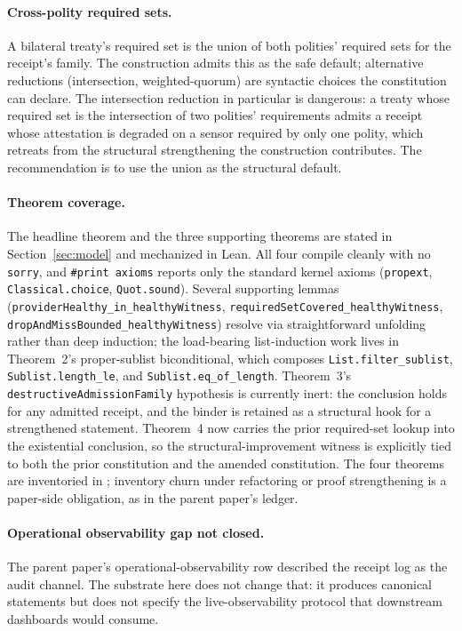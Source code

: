 \paragraph{Cross-polity required sets.}
A bilateral treaty's required set is the union of both polities' required sets for the receipt's family. The construction admits this as the safe default; alternative reductions (intersection, weighted-quorum) are syntactic choices the constitution can declare. The intersection reduction in particular is dangerous: a treaty whose required set is the intersection of two polities' requirements admits a receipt whose attestation is degraded on a sensor required by only one polity, which retreats from the structural strengthening the construction contributes. The recommendation is to use the union as the structural default.

\paragraph{Theorem coverage.}
The headline theorem and the three supporting theorems are stated in Section~\ref{sec:model} and mechanized in Lean. All four compile cleanly with no \texttt{sorry}, and \texttt{\#print axioms} reports only the standard kernel axioms (\texttt{propext}, \texttt{Classical.choice}, \texttt{Quot.sound}). Several supporting lemmas (\texttt{providerHealthy\_in\_healthyWitness}, \texttt{requiredSetCovered\_healthyWitness}, \texttt{dropAndMissBounded\_healthyWitness}) resolve via straightforward unfolding rather than deep induction; the load-bearing list-induction work lives in Theorem~2's proper-sublist biconditional, which composes \texttt{List.filter\_sublist}, \texttt{Sublist.length\_le}, and \texttt{Sublist.eq\_of\_length}. Theorem~3's \texttt{destructiveAdmissionFamily} hypothesis is currently inert: the conclusion holds for any admitted receipt, and the binder is retained as a structural hook for a strengthened statement. Theorem~4 now carries the prior required-set lookup into the existential conclusion, so the structural-improvement witness is explicitly tied to both the prior constitution and the amended constitution. The four theorems are inventoried in ; inventory churn under refactoring or proof strengthening is a paper-side obligation, as in the parent paper's ledger.

\paragraph{Operational observability gap not closed.}
The parent paper's operational-observability row described the receipt log as the audit channel. The substrate here does not change that: it produces canonical statements but does not specify the live-observability protocol that downstream dashboards would consume.

